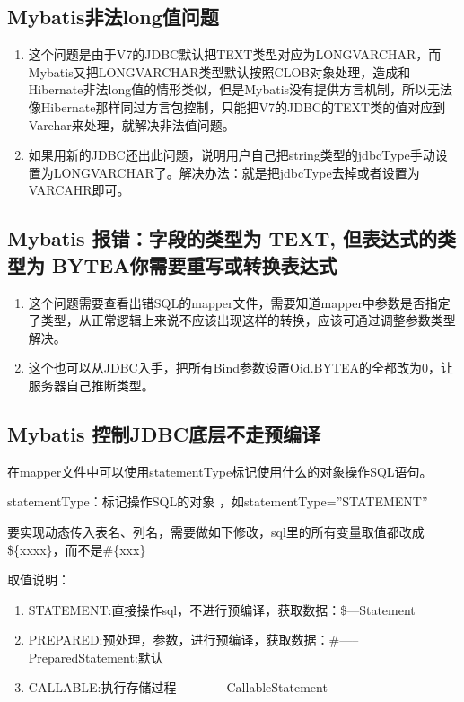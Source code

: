 \documentclass[letterpaper,10pt,english]{sphinxmanual}
\begin{document}
\subsection{Mybatis非法long值问题}
\label{\detokenize{interface/mybatis:mybatislong}}\begin{enumerate}
%
\item {} 
这个问题是由于V7的JDBC默认把TEXT类型对应为LONGVARCHAR，而Mybatis又把LONGVARCHAR类型默认按照CLOB对象处理，造成和Hibernate非法long值的情形类似，但是Mybatis没有提供方言机制，所以无法像Hibernate那样同过方言包控制，只能把V7的JDBC的TEXT类的值对应到Varchar来处理，就解决非法值问题。

\item {} 
如果用新的JDBC还出此问题，说明用户自己把string类型的jdbcType手动设置为LONGVARCHAR了。解决办法：就是把jdbcType去掉或者设置为VARCAHR即可。

\end{enumerate}


\subsection{Mybatis 报错：字段的类型为 TEXT, 但表达式的类型为 BYTEA你需要重写或转换表达式}
\label{\detokenize{interface/mybatis:mybatis-text-bytea}}\begin{enumerate}
%
\item {} 
这个问题需要查看出错SQL的mapper文件，需要知道mapper中参数是否指定了类型，从正常逻辑上来说不应该出现这样的转换，应该可通过调整参数类型解决。

\item {} 
这个也可以从JDBC入手，把所有Bind参数设置Oid.BYTEA的全都改为0，让服务器自己推断类型。

\end{enumerate}


\subsection{Mybatis 控制JDBC底层不走预编译}
\label{\detokenize{interface/mybatis:mybatis-jdbc}}
在mapper文件中可以使用statementType标记使用什么的对象操作SQL语句。

statementType：标记操作SQL的对象 ，如statementType=”STATEMENT”

要实现动态传入表名、列名，需要做如下修改，sql里的所有变量取值都改成\$\{xxxx\}，而不是\#\{xxx\}

取值说明：
\begin{enumerate}
%
\item {} 
STATEMENT:直接操作sql，不进行预编译，获取数据：\$—Statement

\item {} 
PREPARED:预处理，参数，进行预编译，获取数据：\#—–PreparedStatement:默认

\item {} 
CALLABLE:执行存储过程————CallableStatement

\end{enumerate}
\end{document}
